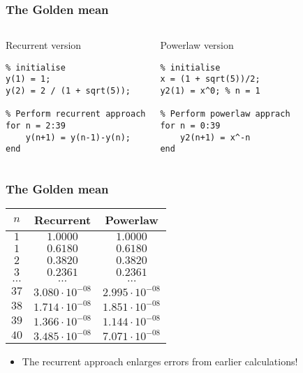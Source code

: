 % 
\begin{frame}[fragile]
  \frametitle{The Golden mean}
  \begin{columns}[T]
      \begin{block}{Recurrent version}
        \begin{lstlisting}
% initialise
y(1) = 1;
y(2) = 2 / (1 + sqrt(5));

% Perform recurrent approach
for n = 2:39
    y(n+1) = y(n-1)-y(n);
end
        \end{lstlisting}
      \end{block}
    \pause
      \begin{block}{Powerlaw version}
        \begin{lstlisting}
% initialise
x = (1 + sqrt(5))/2;
y2(1) = x^0; % n = 1

% Perform powerlaw apprach
for n = 0:39
    y2(n+1) = x^-n
end
        \end{lstlisting}
      \end{block}
  \end{columns}
\end{frame}
% 
\begin{frame}[fragile]
  \frametitle{The Golden mean}
    \begin{longtable}{c!{\vrule}cc}
    \hline
      $n$   & Recurrent & Powerlaw \\ \hline
      $1$   & $1.0000$ & $1.0000$ \\
      $1$   & $0.6180$ & $0.6180$ \\
      $2$   & $0.3820$ & $0.3820$ \\
      $3$   & $0.2361$ & $0.2361$ \\
      $\ldots$ & $\ldots$ & $\ldots$ \\
      $37$ & $3.080\cdot10^{-08}$ & $2.995\cdot10^{-08}$ \\
      $38$ & $1.714\cdot10^{-08}$ & $1.851\cdot10^{-08}$ \\
      $39$ & $1.366\cdot10^{-08}$ & $1.144\cdot10^{-08}$ \\
      $40$ & $3.485\cdot10^{-08}$ & $7.071\cdot10^{-08}$ \\ \hline
    \end{longtable} 
    \begin{itemize}
       \item The recurrent approach enlarges errors from earlier calculations!
    \end{itemize}
\end{frame}

